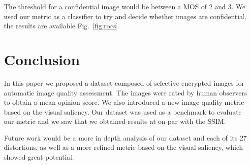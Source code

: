 \documentclass{article}
\begin{document}
The threshold for a confidential image would be between a MOS of 2 and 3. We used our metric as a classifier to try and decide whether images are confidential, the results are available Fig.~\ref{fig:rocs}.

\section{Conclusion}
\label{sec:conclusion}

In this paper we proposed a dataset composed of selective encrypted images for automatic image quality assessment. The images were rated by human observers to obtain a mean opinion score. We also introduced a new image quality metric based on the visual saliency. Our dataset was used as a benchmark to evaluate our metric and we saw that we obtained results at on par with the SSIM.

Future work would be a more in depth analysis of our dataset and each of its 27 distortions, as well as a more refined metric based on the visual saliency, which showed great potential.

\newpage


\end{document}
